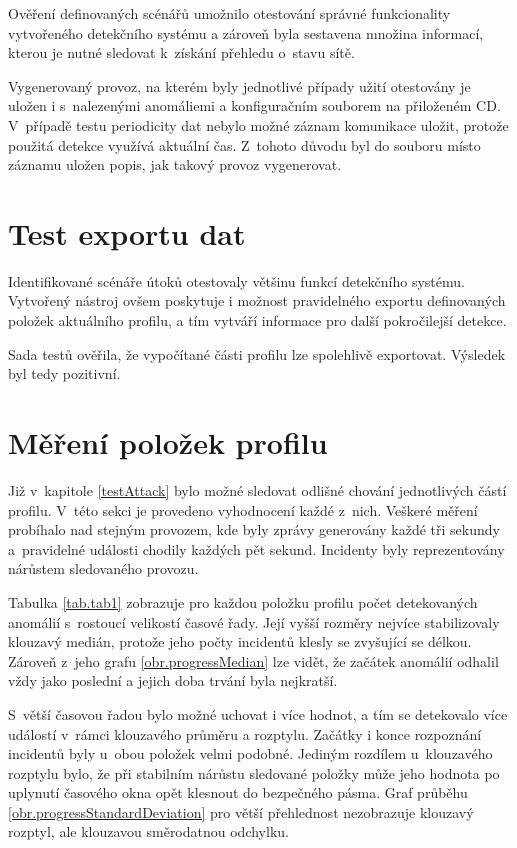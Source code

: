   Ověření definovaných scénářů umožnilo otestování správné funkcionality vytvořeného detekčního
  systému a zároveň byla sestavena množina informací, kterou je nutné sledovat k~získání 
  přehledu o~stavu sítě.
  
  Vygenerovaný provoz, na kterém byly jednotlivé případy užití otestovány je uložen i s~nalezenými
  anomáliemi a konfiguračním souborem na přiloženém CD. V~případě testu periodicity dat nebylo možné záznam 
  komunikace uložit, protože použitá detekce využívá aktuální čas. Z~tohoto důvodu 
  byl do souboru místo záznamu uložen popis, jak takový provoz vygenerovat.

\section{Test exportu dat}
Identifikované scénáře útoků otestovaly většinu funkcí detekčního systému. Vytvořený nástroj
ovšem poskytuje i možnost pravidelného exportu definovaných položek aktuálního profilu, a tím 
vytváří informace pro další pokročilejší detekce. 

Sada testů ověřila, že vypočítané části profilu lze spolehlivě exportovat. Výsledek byl tedy
pozitivní.

\section{Měření položek profilu}
Již v~kapitole \ref{testAttack} bylo možné sledovat odlišné chování 
jednotlivých částí profilu. V~této sekci je provedeno vyhodnocení každé z~nich. Veškeré 
měření probíhalo nad stejným provozem, kde byly zprávy generovány každé tři sekundy a~pravidelné
události chodily každých pět sekund. Incidenty byly reprezentovány nárůstem sledovaného provozu.

Tabulka \ref{tab.tab1} zobrazuje pro každou položku profilu počet detekovaných anomálií 
s~rostoucí velikostí časové řady. Její vyšší rozměry nejvíce stabilizovaly klouzavý medián, protože jeho počty
incidentů klesly se zvyšující se délkou. Zároveň z~jeho grafu \ref{obr.progressMedian} lze vidět,
že začátek anomálií odhalil vždy jako poslední a jejich doba trvání byla nejkratší. 

S~větší časovou řadou bylo možné uchovat i více hodnot, a 
tím se detekovalo více událostí v~rámci klouzavého průměru a rozptylu. Začátky i konce rozpoznání incidentů
byly u~obou položek velmi podobné. Jediným rozdílem u~klouzavého rozptylu bylo, že při stabilním 
nárůstu sledované položky může jeho hodnota po uplynutí časového okna opět klesnout do bezpečného pásma. 
Graf průběhu \ref{obr.progressStandardDeviation} pro větší přehlednost nezobrazuje klouzavý rozptyl, ale 
klouzavou směrodatnou odchylku. 

